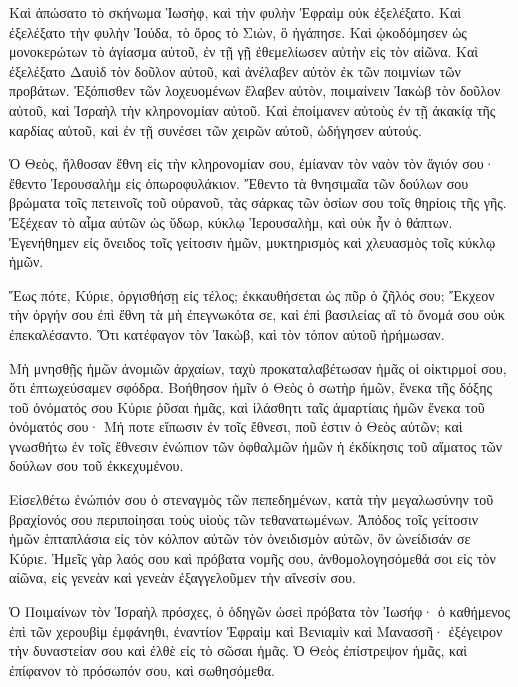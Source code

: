 \begin{spacing}{1.1}
\begin{multicols}{2}
Καὶ ἀπώσατο τὸ σκήνωμα Ἰωσὴφ, καὶ τὴν φυλὴν Ἐφραὶμ
οὐκ ἐξελέξατο. Καὶ ἐξελέξατο τὴν φυλὴν Ἰούδα, τὸ ὄρος τὸ
Σιὼν, ὃ ἠγάπησε. Καὶ ᾠκοδόμησεν ὡς μονοκερώτων τὸ ἁγίασμα αὐτοῦ, ἐν τῇ γῇ ἐθεμελίωσεν αὐτὴν εἰς τὸν αἰῶνα.
Καὶ ἐξελέξατο Δαυὶδ τὸν δοῦλον αὐτοῦ, καὶ ἀνέλαβεν αὐτὸν ἐκ τῶν
ποιμνίων τῶν προβάτων. Ἐξόπισθεν τῶν λοχευομένων ἔλαβεν αὐτὸν, ποιμαίνειν Ἰακὼβ τὸν δοῦλον αὐτοῦ, καὶ Ἰσραὴλ τὴν
κληρονομίαν αὐτοῦ. Καὶ ἐποίμανεν αὐτοὺς ἐν τῇ ἀκακίᾳ τῆς καρδίας αὐτοῦ, καὶ ἐν τῇ συνέσει τῶν χειρῶν αὐτοῦ, ὡδήγησεν αὐτούς.

Ὁ Θεὸς, ἤλθοσαν ἔθνη εἰς τὴν κληρονομίαν σου, ἐμίαναν τὸν ναὸν τὸν ἅγιόν σου· ἔθεντο Ἱερουσαλὴμ εἰς ὀπωροφυλάκιον.
Ἔθεντο τὰ θνησιμαῖα τῶν δούλων σου βρώματα τοῖς πετεινοῖς τοῦ οὐρανοῦ, τὰς σάρκας τῶν ὁσίων σου τοῖς θηρίοις τῆς γῆς.
Ἐξέχεαν τὸ αἷμα αὐτῶν ὡς ὕδωρ, κύκλῳ Ἱερουσαλὴμ, καὶ οὐκ ἦν ὁ θάπτων.
Ἐγενήθημεν εἰς ὄνειδος τοῖς γείτοσιν ἡμῶν, μυκτηρισμὸς καὶ χλευασμὸς τοῖς κύκλῳ ἡμῶν.

Ἕως πότε, Κύριε, ὀργισθήσῃ εἰς τέλος; ἐκκαυθήσεται ὡς πῦρ ὁ ζῆλός σου;
Ἔκχεον τὴν ὀργήν σου ἐπὶ ἔθνη τὰ μὴ ἐπεγνωκότα σε, καὶ ἐπὶ βασιλείας αἳ τὸ ὄνομά σου οὐκ ἐπεκαλέσαντο.
Ὅτι κατέφαγον τὸν Ἰακὼβ, καὶ τὸν τόπον αὐτοῦ ἠρήμωσαν.

Μὴ μνησθῇς ἡμῶν ἀνομιῶν ἀρχαίων, ταχὺ προκαταλαβέτωσαν ἡμᾶς οἱ οἰκτιρμοί σου, ὅτι ἐπτωχεύσαμεν σφόδρα.
Βοήθησον ἡμῖν ὁ Θεὸς ὁ σωτὴρ ἡμῶν, ἕνεκα τῆς δόξης τοῦ ὀνόματός σου Κύριε ῥῦσαι ἡμᾶς, καὶ ἱλάσθητι ταῖς ἁμαρτίαις ἡμῶν ἕνεκα τοῦ ὀνόματός σου·
Μή ποτε εἴπωσιν ἐν τοῖς ἔθνεσι, ποῦ ἐστιν ὁ Θεὸς αὐτῶν; καὶ γνωσθήτω ἐν τοῖς ἔθνεσιν ἐνώπιον τῶν ὀφθαλμῶν ἡμῶν ἡ ἐκδίκησις τοῦ αἵματος τῶν δούλων σου τοῦ ἐκκεχυμένου.

Εἰσελθέτω ἐνώπιόν σου ὁ στεναγμὸς τῶν πεπεδημένων, κατὰ τὴν μεγαλωσύνην τοῦ βραχίονός σου περιποίησαι τοὺς υἱοὺς τῶν τεθανατωμένων.
Ἀπόδος τοῖς γείτοσιν ἡμῶν ἑπταπλάσια εἰς τὸν κόλπον αὐτῶν τὸν ὀνειδισμὸν αὐτῶν, ὃν ὠνείδισάν σε Κύριε.
Ἡμεῖς γὰρ λαός σου καὶ πρόβατα νομῆς σου, ἀνθομολογησόμεθά σοι εἰς τὸν αἰῶνα, εἰς γενεὰν καὶ γενεὰν ἐξαγγελοῦμεν τὴν αἴνεσίν σου.

Ὁ Ποιμαίνων τὸν Ἰσραὴλ πρόσχες, ὁ ὁδηγῶν ὡσεὶ πρόβατα τὸν Ἰωσήφ· ὁ καθήμενος ἐπὶ τῶν χερουβὶμ ἐμφάνηθι,
ἐναντίον Ἐφραὶμ καὶ Βενιαμὶν καὶ Μανασσῆ· ἐξέγειρον τὴν δυναστείαν σου καὶ ἐλθὲ εἰς τὸ σῶσαι ἡμᾶς.
Ὁ Θεὸς ἐπίστρεψον ἡμᾶς, καὶ ἐπίφανον τὸ πρόσωπόν σου, καὶ σωθησόμεθα.


\end{multicols}
\end{spacing}
